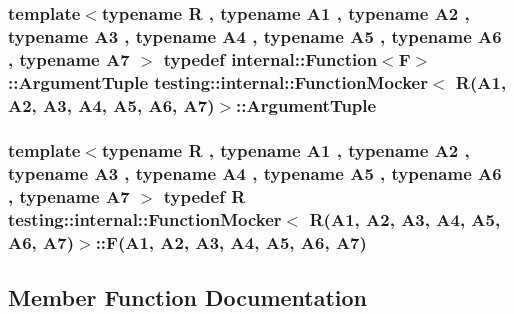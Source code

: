\subsubsection[{\texorpdfstring{Argument\+Tuple}{ArgumentTuple}}]{\setlength{\rightskip}{0pt plus 5cm}template$<$typename R , typename A1 , typename A2 , typename A3 , typename A4 , typename A5 , typename A6 , typename A7 $>$ typedef {\bf internal\+::\+Function}$<${\bf F}$>$\+::{\bf Argument\+Tuple} {\bf testing\+::internal\+::\+Function\+Mocker}$<$ R(A1, A2, A3, A4, A5, A6, A7)$>$\+::{\bf Argument\+Tuple}}\hypertarget{classtesting_1_1internal_1_1_function_mocker_3_01_r_07_a1_00_01_a2_00_01_a3_00_01_a4_00_01_a5_00_01_a6_00_01_a7_08_4_a313911b9c80b57c8c25f0ad5ef2d0bdc}{}\label{classtesting_1_1internal_1_1_function_mocker_3_01_r_07_a1_00_01_a2_00_01_a3_00_01_a4_00_01_a5_00_01_a6_00_01_a7_08_4_a313911b9c80b57c8c25f0ad5ef2d0bdc}
\subsubsection[{\texorpdfstring{F}{F}}]{\setlength{\rightskip}{0pt plus 5cm}template$<$typename R , typename A1 , typename A2 , typename A3 , typename A4 , typename A5 , typename A6 , typename A7 $>$ typedef R {\bf testing\+::internal\+::\+Function\+Mocker}$<$ R(A1, A2, A3, A4, A5, A6, A7)$>$\+::F(A1, A2, A3, A4, A5, A6, A7)}\hypertarget{classtesting_1_1internal_1_1_function_mocker_3_01_r_07_a1_00_01_a2_00_01_a3_00_01_a4_00_01_a5_00_01_a6_00_01_a7_08_4_a2ea0e33d9cc0d1f57d58b4aee98c117c}{}\label{classtesting_1_1internal_1_1_function_mocker_3_01_r_07_a1_00_01_a2_00_01_a3_00_01_a4_00_01_a5_00_01_a6_00_01_a7_08_4_a2ea0e33d9cc0d1f57d58b4aee98c117c}


\subsection{Member Function Documentation}
